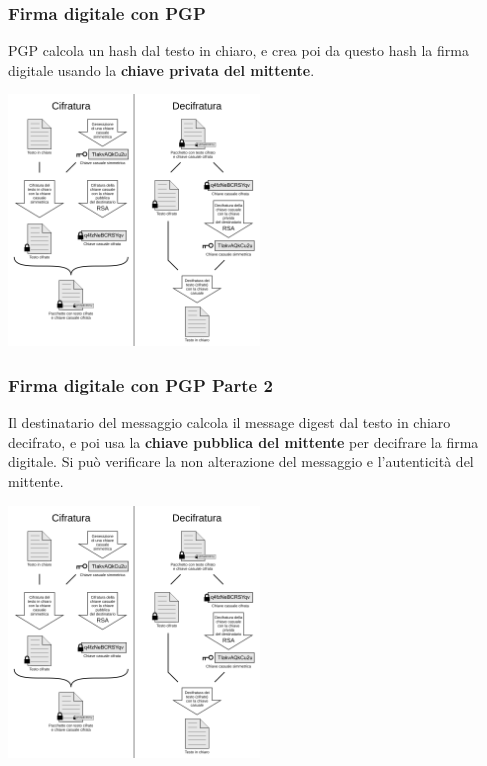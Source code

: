 \begin{frame}
    \frametitle{Firma digitale con PGP}
PGP calcola un hash dal testo in chiaro, e crea poi da questo hash la firma digitale usando la  \textbf{chiave privata del mittente}.
\begin{center}
    \includegraphics[width=0.5\textwidth]{img/1-img/PGP_diagram_IT.png}
\end{center}
\end{frame}

\begin{frame}
    \frametitle{Firma digitale con PGP Parte 2}
Il destinatario del messaggio calcola il message digest dal testo in chiaro decifrato, e poi usa la \textbf{chiave pubblica del mittente} per decifrare la firma digitale.
Si può verificare la non alterazione del messaggio e l'autenticità del mittente.

\begin{center}
    \includegraphics[width=0.5\textwidth]{img/1-img/PGP_diagram_IT.png}
\end{center}
\end{frame}